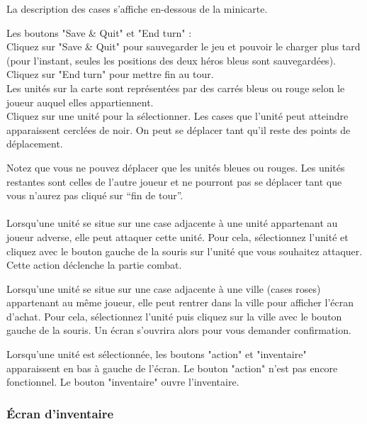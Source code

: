 \documentclass[11pt,a4paper]{article}
\begin{document}
La description des cases s'affiche en-dessous de la minicarte.

Les boutons "Save \& Quit" et "End turn" :\\
Cliquez sur "Save \& Quit" pour sauvegarder le jeu et pouvoir le charger plus tard (pour l'instant, seules les positions des deux héros bleus sont sauvegardées).
Cliquez sur "End turn" pour mettre fin au tour.\\

Les unités sur la carte sont représentées par des carrés bleus ou rouge selon le joueur auquel elles appartiennent. \\
Cliquez sur une unité pour la sélectionner. Les cases que l'unité peut atteindre apparaissent cerclées de noir. On peut se déplacer tant qu'il reste des points de déplacement.

Notez que vous ne pouvez déplacer que les unités bleues ou rouges. Les unités restantes sont celles de l'autre joueur et ne pourront pas se déplacer tant que vous n'aurez pas cliqué sur ``fin de tour''. \\
\\

Lorsqu'une unité se situe sur une case adjacente à une unité appartenant au joueur adverse, elle peut attaquer cette unité. Pour cela, sélectionnez l'unité et cliquez avec le bouton gauche de la souris sur l'unité que vous souhaitez attaquer. Cette action déclenche la partie combat.

Lorsqu'une unité se situe sur une case adjacente à une ville (cases roses) appartenant au même joueur, elle peut rentrer dans la ville pour afficher l'écran d'achat. Pour cela, sélectionnez l'unité puis cliquez sur la ville avec le bouton gauche de la souris. Un écran s'ouvrira alors pour vous demander confirmation.

Lorsqu'une unité est sélectionnée, les boutons "action" et "inventaire" apparaissent en bas à gauche de l'écran.
Le bouton "action" n'est pas encore fonctionnel.
Le bouton "inventaire" ouvre l'inventaire.

\clearpage

\subsubsection{Écran d'inventaire}
\end{document}
